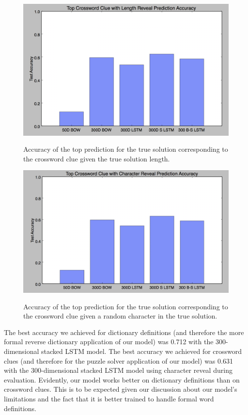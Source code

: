 \documentclass{article} %
\begin{document}
\begin{figure}
	\includegraphics{top50len.png}
	\label{Fig 4}
	\caption{Accuracy of the top prediction for the true solution corresponding to the crossword clue given the true solution length.}
\end{figure}

\begin{figure}
	\includegraphics{top50char.png}
	\label{Fig 6}
	\caption{Accuracy of the top prediction for the true solution corresponding to the crossword clue given a random character in the true solution.}
\end{figure}


The best accuracy we achieved for dictionary definitions (and therefore the more formal reverse dictionary application of our model) was 0.712 with the 300-dimensional stacked LSTM model. The best accuracy we achieved for crossword clues (and therefore for the puzzle solver application of our model) was 0.631 with the 300-dimensional stacked LSTM model using character reveal during evaluation. 
Evidently, our model works better on dictionary definitions than on crossword clues. This is to be expected given our discussion about our model’s limitations and the fact that it is better trained to handle formal word definitions. 
\end{document}
